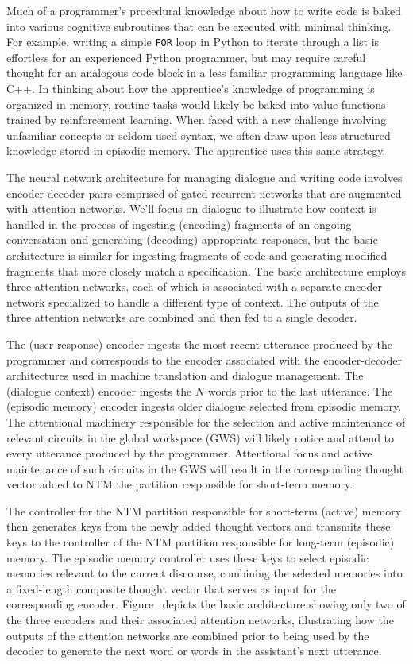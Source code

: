 Much of a programmer’s procedural knowledge about how to write code is baked into various cognitive subroutines that can be executed with minimal thinking. For example, writing a simple {\tt{FOR}} loop in Python to iterate through a list is effortless for an experienced Python programmer, but may require careful thought for an analogous code block in a less familiar programming language like C++. In thinking about how the apprentice’s knowledge of programming is organized in memory, routine tasks would likely be baked into value functions trained by reinforcement learning. When faced with a new challenge involving unfamiliar concepts or seldom used syntax, we often draw upon less structured knowledge stored in episodic memory. The apprentice uses this same strategy.

The neural network architecture for managing dialogue and writing code involves encoder-decoder pairs comprised of gated recurrent networks that are augmented with attention networks. We’ll focus on dialogue to illustrate how context is handled in the process of ingesting (encoding) fragments of an ongoing conversation and generating (decoding) appropriate responses, but the basic architecture is similar for ingesting fragments of code and generating modified fragments that more closely match a specification. The basic architecture employs three attention networks, each of which is associated with a separate encoder network specialized to handle a different type of context. The outputs of the three attention networks are combined and then fed to a single decoder.

The (user response) encoder ingests the most recent utterance produced by the programmer and corresponds to the encoder associated with the encoder-decoder architectures used in machine translation and dialogue management. The (dialogue context) encoder ingests the $N$ words prior to the last utterance. The (episodic memory) encoder ingests older dialogue selected from episodic memory. The attentional machinery responsible for the selection and active maintenance of relevant circuits in the global workspace (GWS) will likely notice and attend to every utterance produced by the programmer. Attentional focus and active maintenance of such circuits in the GWS will result in the corresponding thought vector added to NTM the partition responsible for short-term memory.  

The controller for the NTM partition responsible for short-term (active) memory then generates keys from the newly added thought vectors and transmits these keys to the controller of the NTM partition responsible for long-term (episodic) memory. The episodic memory controller uses these keys to select episodic memories relevant to the current discourse, combining the selected memories into a fixed-length composite thought vector that serves as input for the corresponding encoder. Figure~{} depicts the basic architecture showing only two of the three encoders and their associated attention networks, illustrating how the outputs of the attention networks are combined prior to being used by the decoder to generate the next word or words in the assistant’s next utterance. 

